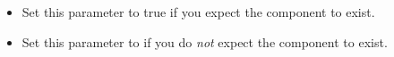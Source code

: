 % 
\begin{itemize}
\item Set this parameter to true if you expect the component to exist.
\item Set this parameter to \gdrefbooleanfalse if you do \emph{not} expect the component to exist.
\end{itemize}
